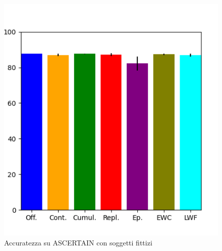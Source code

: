 \begin{figure}[!tbp]
\begin{minipage}[b]{0.5\textwidth}
		\includegraphics[width=\textwidth]{img/graphs/customascertain_final_accuracy.png}
		\caption{Accuratezza su ASCERTAIN con soggetti fittizi}
		\label{fig:customascertain_accuracy_graph}
	\end{minipage}
\end{figure}